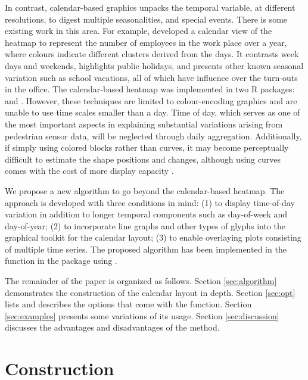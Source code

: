 \documentclass[article]{jss}
\theoremstyle{definition}
\theoremstyle{definition}
\theoremstyle{remark}
\begin{document}
In contrast, calendar-based graphics unpacks the temporal variable, at
different resolutions, to digest multiple seasonalities, and special
events. There is some existing work in this area. For example,
\citet{VanWijkCluster1999} developed a calendar view of the heatmap to
represent the number of employees in the work place over a year, where
colours indicate different clusters derived from the days. It contrasts
week days and weekends, highlights public holidays, and presents other
known seasonal variation such as school vacations, all of which have
influence over the turn-outs in the office. The calendar-based heatmap
was implemented in two R packages: 
\citep{R-ggTimeSeries} and  \citep{R-ggcal}. However, these
techniques are limited to colour-encoding graphics and are unable to use
time scales smaller than a day. Time of day, which serves as one of the
most important aspects in explaining substantial variations arising from
pedestrian sensor data, will be neglected through daily aggregation.
Additionally, if simply using colored blocks rather than curves, it may
become perceptually difficult to estimate the shape positions and
changes, although using curves comes with the cost of more display
capacity \citep{cleveland1984graphical, lam2007overview}.

We propose a new algorithm to go beyond the calendar-based heatmap. The
approach is developed with three conditions in mind: (1) to display
time-of-day variation in addition to longer temporal components such as
day-of-week and day-of-year; (2) to incorporate line graphs and other
types of glyphs into the graphical toolkit for the calendar layout; (3)
to enable overlaying plots consisting of multiple time series. The
proposed algorithm has been implemented in the 
function in the  package \citep{R-sugrrants} using
 \citep{R-base}.

The remainder of the paper is organized as follows. Section
\ref{sec:algorithm} demonstrates the construction of the calendar layout
in depth. Section \ref{sec:opt} lists and describes the options that
come with the  function. Section \ref{sec:examples}
presents some variations of its usage. Section \ref{sec:discussion}
discusses the advantages and disadvantages of the method.

\section{Construction}\label{construction}
\end{document}
